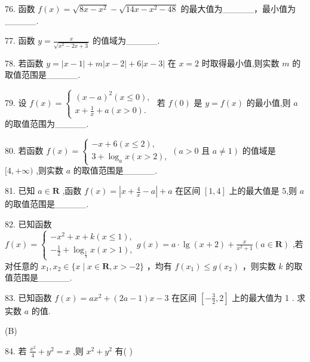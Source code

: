 \documentclass[10pt]{article}
\begin{document}
76. 函数 \(f\left( x\right)  = \sqrt{{8x} - {x}^{2}} - \sqrt{{14x} - {x}^{2} - {48}}\) 的最大值为\_\_\_\_\_，最小值为\_\_\_\_\_.

77. 函数 \(y = \frac{x}{\sqrt{{x}^{2} - {2x} + 3}}\) 的值域为\_\_\_\_\_.

78. 若函数 \(y = \left| {x - 1}\right|  + m\left| {x - 2}\right|  + 6\left| {x - 3}\right|\) 在 \(x = 2\) 时取得最小值,则实数 \(m\) 的取值范围是\_\_\_\_\_.

79. 设 \(f\left( x\right)  = \left\{  \begin{array}{l} {\left( x - a\right) }^{2}\left( {x \leq  0}\right) , \\  x + \frac{1}{x} + a\left( {x > 0}\right) . \end{array}\right.\) 若 \(f\left( 0\right)\) 是 \(y = f\left( x\right)\) 的最小值,则 \(a\) 的取值范围为\_\_\_\_\_.

80. 若函数 \(f\left( x\right)  = \left\{  {\begin{array}{l}  - x + 6\left( {x \leq  2}\right) , \\  3 + {\log }_{a}x\left( {x > 2}\right) , \end{array}\left( {a > 0\text{ 且 }a \neq  1}\right) }\right.\) 的值域是 \(\lbrack 4, + \infty )\) ,则实数 \(a\) 的取值范围是\_\_\_\_\_.

81. 已知 \(a \in  \mathbf{R}\) ,函数 \(f\left( x\right)  = \left| {x + \frac{4}{x} - a}\right|  + a\) 在区间 \(\left\lbrack  {1,4}\right\rbrack\) 上的最大值是 5,则 \(a\) 的取值范围是\_\_\_\_\_.

82. 已知函数 \(f\left( x\right)  = \left\{  \begin{array}{l}  - {x}^{2} + x + k\left( {x \leq  1}\right) , \\   - \frac{1}{2} + {\log }_{\frac{1}{3}}x\left( {x > 1}\right) , \end{array}\right. g\left( x\right)  = a \cdot  \lg \left( {x + 2}\right)  + \frac{x}{{x}^{2} + 1}\left( {a \in  \mathbf{R}}\right)\) ,若对任意的 \({x}_{1},{x}_{2} \in  \{ x \mid  x \in  \mathbf{R},x >  - 2\}\) ，均有 \(f\left( {x}_{1}\right)  \leq  g\left( {x}_{2}\right)\) ，则实数 \(k\) 的取值范围是\_\_\_\_\_.

83. 已知函数 \(f\left( x\right)  = a{x}^{2} + \left( {{2a} - 1}\right) x - 3\) 在区间 \(\left\lbrack  {-\frac{3}{2},2}\right\rbrack\) 上的最大值为 1 . 求实数 \(a\) 的值.

(B)

84. 若 \(\frac{{x}^{2}}{4} + {y}^{2} = x\) ,则 \({x}^{2} + {y}^{2}\) 有(   )
\end{document}
